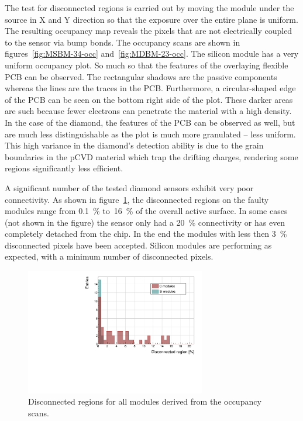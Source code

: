 The test for disconnected regions is carried out by moving the module under the source in X and Y direction so that the exposure over the entire plane is uniform. The resulting occupancy map reveals the pixels that are not electrically coupled to the sensor via bump bonds. The occupancy scans are shown in figures~\ref{fig:MSBM-34-occ} and~\ref{fig:MDBM-23-occ}. The silicon module has a very uniform occupancy plot. So much so that the features of the overlaying flexible PCB can be observed. The rectangular shadows are the passive components whereas the lines are the traces in the PCB. Furthermore, a circular-shaped edge of the PCB can be seen on the bottom right side of the plot. These darker areas are such because fewer electrons can penetrate the material with a high density. In the case of the diamond, the features of the PCB can be observed as well, but are much less distinguishable as the plot is much more granulated -- less uniform. This high variance in the diamond's detection ability is due to the grain boundaries in the pCVD material which trap the drifting charges, rendering some regions significantly less efficient. 

A significant number of the tested diamond sensors exhibit very poor connectivity. As shown in figure~\ref{fig:disconreg}, the disconnected regions on the faulty modules range from 0.1~\% to~16~\% of the overall active surface. In some cases (not shown in the figure) the sensor only had a 20~\% connectivity or has even completely detached from the chip. In the end the modules with less then 3~\% disconnected pixels have been accepted. Silicon modules are performing as expected, with a minimum number of disconnected pixels.


\begin{figure}[!t]
\centering
\includegraphics[width=0.7\textwidth]{../scripts/04_charge_monitoring/plots/disconnectedregion1} \caption{Disconnected regions for all modules derived from the occupancy scans.}
\label{fig:disconreg}
\end{figure}






